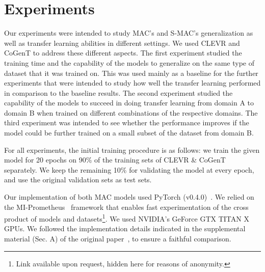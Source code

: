 \section{Experiments}

Our experiments were intended to study MAC's and S-MAC's generalization as well as transfer learning abilities in different settings. We used CLEVR and CoGenT to address these different aspects.
The first experiment studied the training time and the capability of the models to generalize on the same type of dataset that it was trained on. This was used mainly as a baseline for the further experiments that were intended to study how well the transfer learning performed in comparison to the baseline results.
The second experiment studied the capability of the models to succeed in doing transfer learning from domain A to domain B when trained on different combinations of the respective domains. The third experiment was intended to see whether the performance improves if the model could be further trained on a small subset of the dataset from domain B.

For all experiments, the initial training procedure is as follows: we train the given model  for 20 epochs on 90\% of the training sets of CLEVR \& CoGenT separately. We keep the remaining 10\% for validating the model at every epoch, and use the original validation sets as test sets.

Our implementation of both MAC models used PyTorch (v0.4.0)~\cite{paszke2017automatic}. We relied on the MI-Prometheus~\cite{kornuta2018accelerating} framework that enables fast experimentation of the cross product of models and datasets\footnote{Link available upon request, hidden here for reasons of anonymity.}. %
We used NVIDIA's GeForce GTX TITAN X GPUs. We followed the implementation details indicated in the supplemental material (Sec. A) of the original paper~\cite{hudson2018compositional}, to ensure a faithful comparison.


